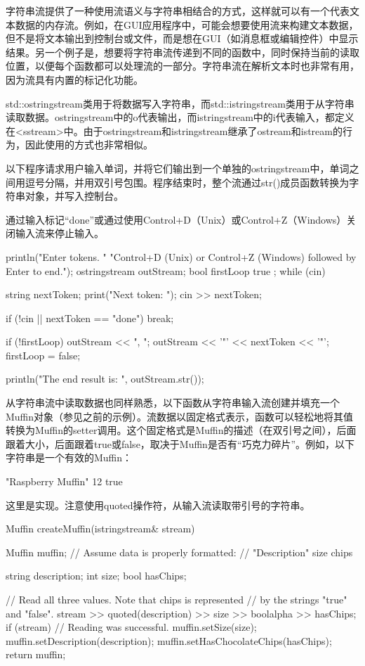 字符串流提供了一种使用流语义与字符串相结合的方式，这样就可以有一个代表文本数据的内存流。例如，在GUI应用程序中，可能会想要使用流来构建文本数据，但不是将文本输出到控制台或文件，而是想在GUI（如消息框或编辑控件）中显示结果。另一个例子是，想要将字符串流传递到不同的函数中，同时保持当前的读取位置，以便每个函数都可以处理流的一部分。字符串流在解析文本时也非常有用，因为流具有内置的标记化功能。

std::ostringstream类用于将数据写入字符串，而std::istringstream类用于从字符串读取数据。ostringstream中的o代表输出，而istringstream中的i代表输入，都定义在<sstream>中。由于ostringstream和istringstream继承了ostream和istream的行为，因此使用的方式也非常相似。

以下程序请求用户输入单词，并将它们输出到一个单独的ostringstream中，单词之间用逗号分隔，并用双引号包围。程序结束时，整个流通过str()成员函数转换为字符串对象，并写入控制台。

通过输入标记“done”或通过使用Control+D（Unix）或Control+Z（Windows）关闭输入流来停止输入。

\begin{cpp}
println("Enter tokens. "
        "Control+D (Unix) or Control+Z (Windows) followed by Enter to end.");
ostringstream outStream;
bool firstLoop { true };
while (cin) {
    string nextToken;
    print("Next token: ");
    cin >> nextToken;

    if (!cin || nextToken == "done") { break; }

    if (!firstLoop) { outStream << ", "; }
    outStream << '"' << nextToken << '"';
    firstLoop = false;
}
println("The end result is: {}", outStream.str());
\end{cpp}

从字符串流中读取数据也同样熟悉，以下函数从字符串输入流创建并填充一个Muffin对象（参见之前的示例）。流数据以固定格式表示，函数可以轻松地将其值转换为Muffin的setter调用。这个固定格式是Muffin的描述（在双引号之间），后面跟着大小，后面跟着true或false，取决于Muffin是否有“巧克力碎片”。例如，以下字符串是一个有效的Muffin：

\begin{shell}
"Raspberry Muffin" 12 true
\end{shell}

这里是实现。注意使用quoted操作符，从输入流读取带引号的字符串。

\begin{cpp}
Muffin createMuffin(istringstream& stream)
{
    Muffin muffin;
    // Assume data is properly formatted:
    // "Description" size chips

    string description;
    int size;
    bool hasChips;

    // Read all three values. Note that chips is represented
    // by the strings "true" and "false".
    stream >> quoted(description) >> size >> boolalpha >> hasChips;
    if (stream) { // Reading was successful.
        muffin.setSize(size);
        muffin.setDescription(description);
        muffin.setHasChocolateChips(hasChips);
    }
    return muffin;
}
\end{cpp}

